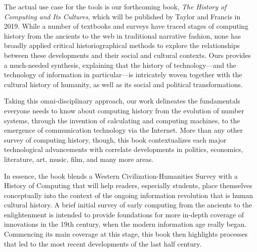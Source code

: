 The actual use case for the tools is our forthcoming book, \emph{The History of Computing and Its Cultures}, which will be published by Taylor and Francis in 2019. While a number of textbooks and surveys have traced stages of computing history from the ancients to the web in traditional narrative fashion, none has broadly applied critical historiographical methods to explore the relationships between these developments and their social and cultural contexts. Ours provides a much-needed synthesis, explaining that the history of technology—and the technology of information in particular—is intricately woven together with the cultural history of humanity, as well as its social and political transformations.
\vspace{5pt}

Taking this omni-disciplinary approach, our work delineates the fundamentals everyone needs to know about computing history from the evolution of number systems, through the invention of calculating and computing machines, to the emergence of communication technology via the Internet. More than any other survey of computing history, though, this book contextualizes each major technological advancements with correlate developments in politics, economics, literature, art, music, film, and many more areas. 
\vspace{5pt}

In essence, the book blends a Western Civilization-Humanities Survey with a History of  Computing that will help readers, especially students, place themselves conceptually into the context of the ongoing information revolution that is human cultural history. A brief initial survey of early computing from the ancients to the enlightenment is intended to provide foundations for more in-depth coverage of innovations in the 19th century, when the modern information age really began. Commencing its main coverage at this stage, this book then highlights processes that led to the most recent developments of the last half century.

\begin{refsection}
    \nocite{dennis_thiruvathukal_dh2019,david_b._dennis_computer_2017}
    \printbibliography[heading=none]
\end{refsection}

